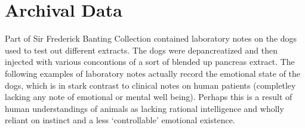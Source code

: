 \documentclass[12pt]{article}
\begin{document}
\begin{enumerate}


\end{enumerate}
\section{Archival Data}
Part of Sir Frederick Banting Collection contained laboratory notes on the dogs used to test out different extracts. The dogs were depancreatized and then injected with various concontions of a sort of blended up pancreas extract. The following examples of laboratory notes actually record the emotional state of the dogs, which is in stark contrast to clinical notes on human patients (completley lacking any note of emotional or mental well being). Perhaps this is a result of human understandings of animals as lacking rational intelligence and wholly reliant on instinct and a less `controllable' emotional existence. 
\end{document}
